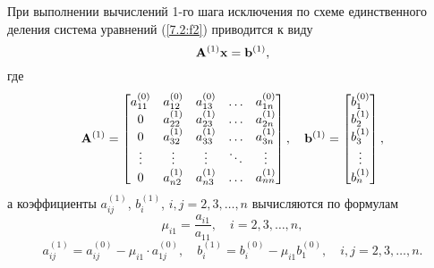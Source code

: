 \documentclass[12pt]{article}
\begin{document}
    При выполнении вычислений 1-го шага исключения по схеме единственного деления система уравнений (\ref{7.2:f2}) приводится к виду
    \begin{equation}
        \bold{A}^{\left(1\right)}\bold{x}=\bold{b}^{\left(1\right)},
        \label{7.2:f3}
    \end{equation}
    где
    \begin{equation}
        \bold{A}^{\left(1\right)}=
        \begin{bmatrix}
        a_{11}^{\left(0\right)} & a_{12}^{\left(0\right)} & a_{13}^{\left(0\right)} & \ldots & a_{1n}^{\left(0\right)} \\
        0 & a_{22}^{\left(1\right)} & a_{23}^{\left(1\right)} & \ldots & a_{2n}^{\left(1\right)} \\
        0 & a_{32}^{{\left(1\right)}} & a_{33}^{\left(1\right)} & \ldots & a_{3n}^{\left(1\right)} \\
        \vdots & \vdots & \vdots & \ddots & \vdots \\
        0 & a_{n2}^{\left(1\right)} & a_{n3}^{\left(1\right)} & \ldots & a_{nn}^{\left(1\right)}
        \end{bmatrix},
        \quad
        \bold{b}^{\left(1\right)}=
        \begin{bmatrix}
            b_1^{\left(0\right)} \\
            b_2^{\left(1\right)} \\
            b_3^{\left(1\right)} \\
            \vdots \\
            b_n^{{\left(1\right)}}
        \end{bmatrix},
    \end{equation}
    а коэффициенты $a_{ij}^{\left(1\right)}$, $b_{i}^{\left(1\right)}$, $i,j=2,3,\ldots,n$ вычисляются по формулам
    \begin{equation}
        \mu_{i1}=\frac{a_{i1}}{a_{11}},\quad i=2,3,\ldots, n,
    \end{equation}
    \begin{equation}
        a_{ij}^{\left(1\right)}=a_{ij}^{\left(0\right)}-\mu_{i1}\cdot a^{\left(0\right)}_{1j},\quad b_{i}^{\left(1\right)}=b_{i}^{\left(0\right)}-\mu_{i1}{b^{\left(0\right)}_{1}},\quad i,j=2,3,\ldots,n.
    \end{equation}
\end{document}
